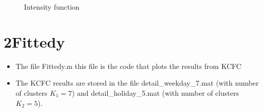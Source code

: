 \documentclass{article}
\begin{document}
\begin{figure}[h!]
\begin{center}
	\caption{Intensity function}%
\end{center}
\end{figure}





\section{2Fittedy}
\begin{itemize}
	\item The file Fittedy.m this file is the code that plots the results from KCFC
	\item The KCFC results are stored in the file  detail\_weekday\_7.mat (with number of clusters $K_1=7$) and	detail\_holiday\_5.mat (with number of clusters $K_2=5$).
\end{itemize}
\end{document}
